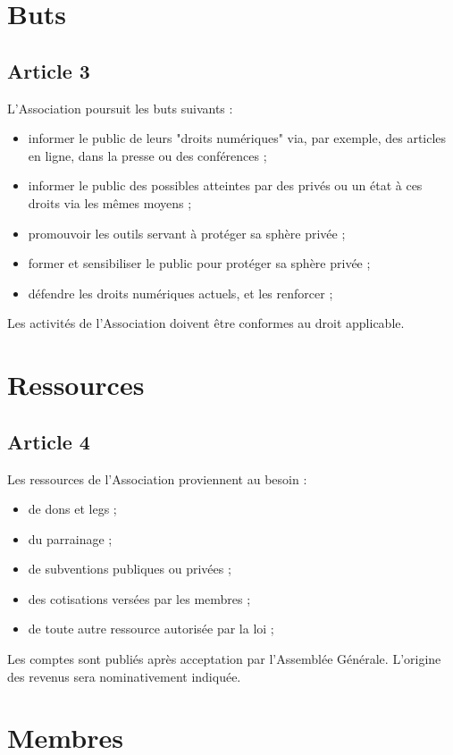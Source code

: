 \documentclass[12pt,twoside]{report}
\begin{document}
\chapter*{Buts}

\section*{Article 3}
L’Association poursuit les buts suivants :
\begin{itemize}
\item informer le public de leurs "droits numériques" via, par exemple, des articles en ligne, dans la presse ou des conférences ;
\item informer le public des possibles atteintes par des privés ou un état à ces droits via les mêmes moyens ;
\item promouvoir les outils servant à protéger sa sphère privée ;
\item former et sensibiliser le public pour protéger sa sphère privée ;
\item défendre les droits numériques actuels, et les renforcer ;
\end{itemize}

Les activités de l’Association doivent être conformes au droit applicable.

\chapter*{Ressources}

\section*{Article 4}
Les ressources de l’Association proviennent au besoin :
\begin{itemize}
\item de dons et legs ;
\item du parrainage ;
\item de subventions publiques ou privées ;
\item des cotisations versées par les membres ;
\item de toute autre ressource autorisée par la loi ;
\end{itemize}

Les comptes sont publiés après acceptation par l’Assemblée Générale. L’origine des revenus sera nominativement indiquée.

\chapter*{Membres}
\end{document}

